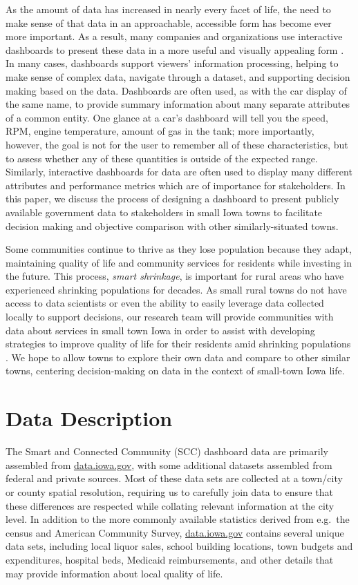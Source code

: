 \documentclass[letterpaper,inpress]{jdsart}
\begin{document}
As the amount of data has increased in nearly every facet of life, the need to make sense of that data in an approachable, accessible form has become ever more important.
As a result, many companies and organizations use interactive dashboards to present these data in a more useful and visually appealing form \citep{fisher}.
In many cases, dashboards support viewers' information processing, helping to make sense of complex data, navigate through a dataset, and supporting decision making based on the data.
Dashboards are often used, as with the car display of the same name, to provide summary information about many separate attributes of a common entity. One glance at a car's dashboard will tell you the speed, RPM, engine temperature, amount of gas in the tank; more importantly, however, the goal is not for the user to remember all of these characteristics, but to assess whether any of these quantities is outside of the expected range.
Similarly, interactive dashboards for data are often used to display many different attributes and performance metrics which are of importance for stakeholders.
In this paper, we discuss the process of designing a dashboard to present publicly available government data to stakeholders in small Iowa towns to facilitate decision making and objective comparison with other similarly-situated towns.

Some communities continue to thrive as they lose population because they adapt, maintaining quality of life and community services for residents while investing in the future. This process, \emph{smart shrinkage}, is important for rural areas who have experienced shrinking populations for decades. As small rural towns do not have access to data scientists or even the ability to easily leverage data collected locally to support decisions, our research team will provide communities with data about services in small town Iowa in order to assist with developing strategies to improve quality of life for their residents amid shrinking populations \citep{scc}. We hope to allow towns to explore their own data and compare to other similar towns, centering decision-making on data in the context of small-town Iowa life.

\section{Data Description}

The Smart and Connected Community (SCC) dashboard data are primarily assembled from \url{data.iowa.gov}, with some additional datasets assembled from federal and private sources. Most of these data sets are collected at a town/city or county spatial resolution, requiring us to carefully join data to ensure that these differences are respected while collating relevant information at the city level. In addition to the more commonly available statistics derived from e.g.~the census and American Community Survey, \url{data.iowa.gov} contains several unique data sets, including local liquor sales, school building locations, town budgets and expenditures, hospital beds, Medicaid reimbursements, and other details that may provide information about local quality of life.
\end{document}
